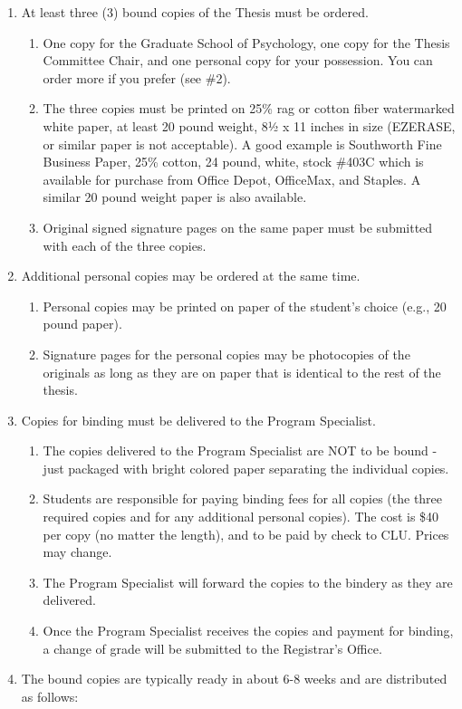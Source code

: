 \documentclass[openany]{book}
\providecommand{\tightlist}{%
  \setlength{\itemsep}{0pt}\setlength{\parskip}{0pt}}
\begin{document}
\begin{enumerate}
\def\labelenumi{\arabic{enumi}.}
\tightlist
\item
  At least three (3) bound copies of the Thesis must be ordered.

  \begin{enumerate}
  \def\labelenumii{\alph{enumii}.}
  \tightlist
  \item
    One copy for the Graduate School of Psychology, one copy for the Thesis Committee Chair, and one personal copy for your possession. You can order more if you prefer (see \#2).
  \item
    The three copies must be printed on 25\% rag or cotton fiber watermarked white paper, at least 20 pound weight, 8½ x 11 inches in size (EZERASE, or similar paper is not acceptable). A good example is Southworth Fine Business Paper, 25\% cotton, 24 pound, white, stock \#403C which is available for purchase from Office Depot, OfficeMax, and Staples. A similar 20 pound weight paper is also available.
  \item
    Original signed signature pages on the same paper must be submitted with each of the three copies.
  \end{enumerate}
\item
  Additional personal copies may be ordered at the same time.

  \begin{enumerate}
  \def\labelenumii{\alph{enumii}.}
  \tightlist
  \item
    Personal copies may be printed on paper of the student's choice (e.g., 20 pound paper).
  \item
    Signature pages for the personal copies may be photocopies of the originals as long as they are on paper that is identical to the rest of the thesis.
  \end{enumerate}
\item
  Copies for binding must be delivered to the Program Specialist.

  \begin{enumerate}
  \def\labelenumii{\alph{enumii}.}
  \tightlist
  \item
    The copies delivered to the Program Specialist are NOT to be bound - just packaged with bright colored paper separating the individual copies.
  \item
    Students are responsible for paying binding fees for all copies (the three required copies and for any additional personal copies). The cost is \$40 per copy (no matter the length), and to be paid by check to CLU. Prices may change.
  \item
    The Program Specialist will forward the copies to the bindery as they are delivered.
  \item
    Once the Program Specialist receives the copies and payment for binding, a change of grade will be submitted to the Registrar's Office.
  \end{enumerate}
\item
  The bound copies are typically ready in about 6-8 weeks and are distributed as follows:


\end{enumerate}
\end{document}
